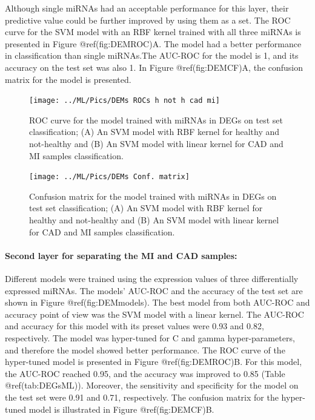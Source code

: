 \documentclass[
]{article}
\begin{document}
Although single miRNAs had an acceptable performance for this layer,
their predictive value could be further improved by using them as a set.
The ROC curve for the SVM model with an RBF kernel trained with all
three miRNAs is presented in Figure @ref(fig:DEMROC)A. The model had a
better performance in classification than single miRNAs.The AUC-ROC for
the model is 1, and its accuracy on the test set was also 1. In Figure
@ref(fig:DEMCF)A, the confusion matrix for the model is presented.

\begin{figure}

{\centering \texttt{[image: ../ML/Pics/DEMs ROCs h not h cad mi]} 

}

\caption{ROC curve for the model trained with miRNAs in DEGs on test set classification; (A) An SVM model with RBF kernel for healthy and not-healthy and (B) An SVM model with linear kernel for CAD and MI samples classification.}\label{fig:DEMROC}
\end{figure}

\begin{figure}

{\centering \texttt{[image: ../ML/Pics/DEMs Conf. matrix]} 

}

\caption{Confusion matrix for the model trained with miRNAs in DEGs on test set classification; (A) An SVM model with RBF kernel for healthy and not-healthy and (B) An SVM model with linear kernel for CAD and MI samples classification.}\label{fig:DEMCF}
\end{figure}

\hypertarget{second-layer-for-separating-the-mi-and-cad-samples-2}{%
\paragraph{Second layer for separating the MI and CAD
samples:}\label{second-layer-for-separating-the-mi-and-cad-samples-2}}

Different models were trained using the expression values of three
differentially expressed miRNAs. The models' AUC-ROC and the accuracy of
the test set are shown in Figure @ref(fig:DEMmodels). The best model
from both AUC-ROC and accuracy point of view was the SVM model with a
linear kernel. The AUC-ROC and accuracy for this model with its preset
values were 0.93 and 0.82, respectively. The model was hyper-tuned for C
and gamma hyper-parameters, and therefore the model showed better
performance. The ROC curve of the hyper-tuned model is presented in
Figure @ref(fig:DEMROC)B. For this model, the AUC-ROC reached 0.95, and
the accuracy was improved to 0.85 (Table @ref(tab:DEGsML)). Moreover,
the sensitivity and specificity for the model on the test set were 0.91
and 0.71, respectively. The confusion matrix for the hyper-tuned model
is illustrated in Figure @ref(fig:DEMCF)B.
\end{document}

